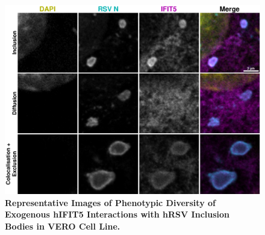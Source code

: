 \begin{figure}
    \centering
    \includegraphics[width=1\linewidth]{09. Chapter 4/Figs/04. Overexpression/03. IFIT5/03. i5-hrsv.pdf}
    \caption[Representative Images of Phenotypic Diversity of Exogenous hIFIT5 Interactions with hRSV Inclusion Bodies in VERO Cell Line.]{\textbf{Representative Images of Phenotypic Diversity of Exogenous hIFIT5 Interactions with hRSV Inclusion Bodies in VERO Cell Line.} }
    \label{fig:Representative Images of Phenotypic Diversity of Exogenous hIFIT5 Interactions with hRSV Inclusion Bodies in VERO Cell Line}
\end{figure}

